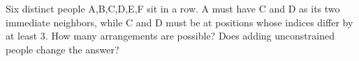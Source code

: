 Six distinct people A,B,C,D,E,F sit in a row. A must have C and D as its two immediate neighbors, while C and D must be at positions whose indices differ by at least 3. How many arrangements are possible? Does adding unconstrained people change the answer?
